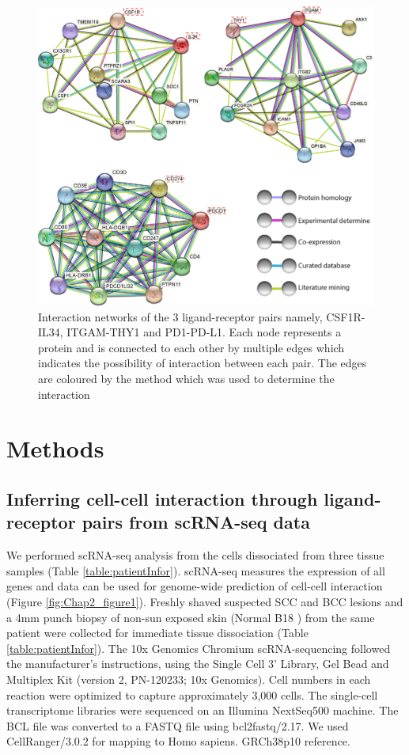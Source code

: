 \begin{figure}[htp]
\renewcommand{\figurename}{Figure}
    \centering
    \includegraphics[width=0.66\columnwidth]{Chapter2/Figures/Supplemental_Fig_S1.png}
    \caption[Interaction networks of the 3 ligand-receptor pairs namely, CSF1R-IL34, ITGAM-THY1 and PD1-PD-L1.]{Interaction networks of the 3 ligand-receptor pairs namely, CSF1R-IL34, ITGAM-THY1 and PD1-PD-L1. Each node represents a protein and is connected to each other by multiple edges which indicates the possibility of interaction between each pair. The edges are coloured by the method which was used to determine the interaction}
    \label{fig:Chap2_Supfigure1}
\end{figure}

\section{Methods}
\label{Sec:Methods}
\subsection{Inferring cell-cell interaction through ligand-receptor pairs from scRNA-seq data}
We performed scRNA-seq analysis from the cells dissociated from three tissue samples (Table \ref{table:patientInfor}). scRNA-seq measures the expression of all genes and data can be used for genome-wide prediction of cell-cell interaction (Figure \ref{fig:Chap2_figure1}). Freshly shaved suspected SCC and BCC lesions and a 4mm punch biopsy of non-sun exposed skin (Normal B18 ) from the same patient were collected for immediate tissue dissociation (Table \ref{table:patientInfor}). The 10x Genomics Chromium scRNA-sequencing followed the manufacturer’s instructions, using the Single Cell 3’ Library, Gel Bead and Multiplex Kit (version 2, PN-120233; 10x Genomics). Cell numbers in each reaction were optimized to capture approximately 3,000 cells. The single-cell transcriptome libraries were sequenced on an Illumina NextSeq500 machine. The BCL file was converted to a FASTQ file using bcl2fastq/2.17. We used CellRanger/3.0.2 for mapping to Homo sapiens. GRCh38p10 reference. 

